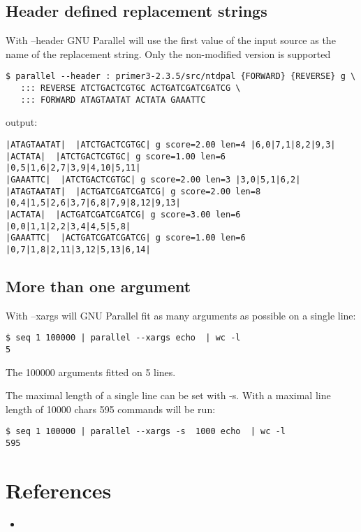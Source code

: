 \documentclass{article}
\begin{document}
\subsection{Header defined replacement strings}
With --header GNU Parallel will use the first value of the input source as the name of the replacement string. Only the non-modified version {} is supported
\begin{lstlisting}
$ parallel --header : primer3-2.3.5/src/ntdpal {FORWARD} {REVERSE} g \
   ::: REVERSE ATCTGACTCGTGC ACTGATCGATCGATCG \
   ::: FORWARD ATAGTAATAT ACTATA GAAATTC
\end{lstlisting}
output:
\begin{lstlisting}
|ATAGTAATAT|  |ATCTGACTCGTGC| g score=2.00 len=4 |6,0|7,1|8,2|9,3|
|ACTATA|  |ATCTGACTCGTGC| g score=1.00 len=6 |0,5|1,6|2,7|3,9|4,10|5,11|
|GAAATTC|  |ATCTGACTCGTGC| g score=2.00 len=3 |3,0|5,1|6,2|
|ATAGTAATAT|  |ACTGATCGATCGATCG| g score=2.00 len=8 |0,4|1,5|2,6|3,7|6,8|7,9|8,12|9,13|
|ACTATA|  |ACTGATCGATCGATCG| g score=3.00 len=6 |0,0|1,1|2,2|3,4|4,5|5,8|
|GAAATTC|  |ACTGATCGATCGATCG| g score=1.00 len=6 |0,7|1,8|2,11|3,12|5,13|6,14|
\end{lstlisting}

\subsection{More than one argument}
With --xargs will GNU Parallel fit as many arguments as possible on a single line:
\begin{lstlisting}
$ seq 1 100000 | parallel --xargs echo  | wc -l
5
\end{lstlisting}
The 100000 arguments fitted on 5 lines.

The maximal length of a single line can be set with -s. With a maximal line length of 10000 chars 595 commands will be run:
\begin{lstlisting}
$ seq 1 100000 | parallel --xargs -s  1000 echo  | wc -l
595
\end{lstlisting}



\section{References}
\begin{itemize}
\item{}
\end{itemize}
\end{document}
